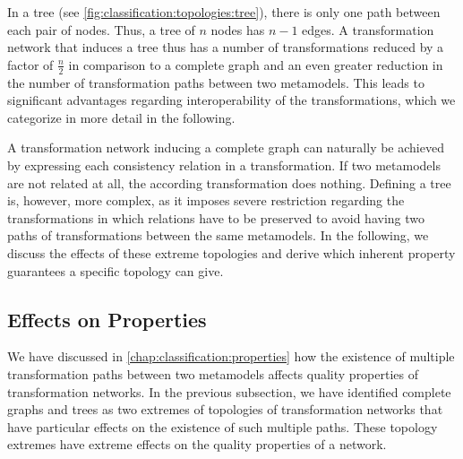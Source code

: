 In a tree (see \autoref{fig:classification:topologies:tree}), there is only one path between each pair of nodes.
Thus, a tree of $n$ nodes has $n-1$ edges.
A transformation network that induces a tree thus has a number of transformations reduced by a factor of $\frac{n}{2}$ in comparison to a complete graph and an even greater reduction in the number of transformation paths between two metamodels.
This leads to significant advantages regarding interoperability of the transformations, which we categorize in more detail in the following.

A transformation network inducing a complete graph can naturally be achieved by expressing each consistency relation in a transformation.
If two metamodels are not related at all, the according transformation does nothing.
Defining a tree is, however, more complex, as it imposes severe restriction regarding the transformations in which relations have to be preserved to avoid having two paths of transformations between the same metamodels.
In the following, we discuss the effects of these extreme topologies and derive which inherent property guarantees a specific topology can give.


\subsection{Effects on Properties}
\label{chap:classification:topologies:effects}

We have discussed in \autoref{chap:classification:properties} how the existence of multiple transformation paths between two metamodels affects quality properties of transformation networks.
In the previous subsection, we have identified complete graphs and trees as two extremes of topologies of transformation networks that have particular effects on the existence of such multiple paths.
These topology extremes have extreme effects on the quality properties of a network.

